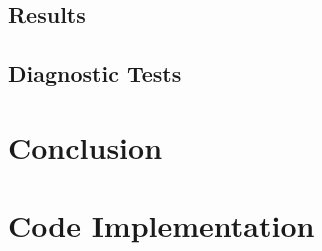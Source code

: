 \documentclass{article} %
\begin{document}
	\subsection{Results}
	\subsection{Diagnostic Tests}\label{sec:diagnostics}
	
	\section{Conclusion}\label{sec:conclusion}
	\newpage
	
	\appendix
	\section{Code Implementation}\label{app:code_a}
	
	
	\newpage
	\nocite{*}
	\printbibliography[title={References}]
\end{document}
